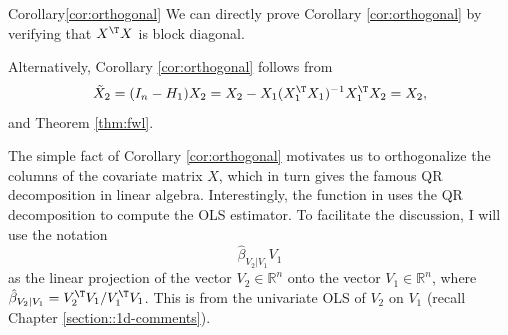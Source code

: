 \begin{myproof}{Corollary}{\ref{cor:orthogonal}}
We can directly prove Corollary \ref{cor:orthogonal} by verifying that $X^{\T} X$ is block diagonal. 

Alternatively, 
Corollary \ref{cor:orthogonal} follows from
\[
\tilde{X}_{2}=(I_{n}-H_{1})X_{2}=X_{2}-X_{1}(X_{1}^{\T}X_{1})^{-1}X_{1}^{\T}X_{2}=X_{2},
\]
 and Theorem \ref{thm:fwl}.
\end{myproof}
 

The simple fact of Corollary \ref{cor:orthogonal} motivates us to orthogonalize the columns of the covariate matrix $X$, which in turn gives the famous QR decomposition in linear algebra. Interestingly, the  function in  uses the QR decomposition to compute the OLS estimator. To facilitate the discussion, I will use the notation
$$
 \hat{\beta}_{V_2|V_1} V_1
$$
as the linear projection of the vector $V_2 \in \mathbb{R}^n$ onto the vector $V_1 \in \mathbb{R}^n$, where $\hat{\beta}_{V_2|V_1}  =  V_2^{\T} V_1  /   V_1^{\T} V_1 $. This is from the univariate OLS of $V_2$ on $ V_1$ (recall Chapter \ref{section::1d-comments}). 



